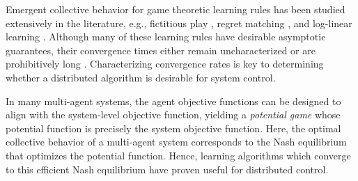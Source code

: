 
\label{ch2}



Emergent collective behavior for game theoretic learning rules has been studied extensively in the literature, e.g., fictitious play \cite{fp1,fp2,jsfp}, regret matching \cite{Hart2000}, and log-linear learning \cite{Alos-Ferrer2010, Blume1993, Shah2010}.  Although many of these learning rules have desirable asymptotic guarantees, their convergence times either remain uncharacterized or are prohibitively long \cite{Ellison2000, Kandori1993,Shah2010,Hart2010}. Characterizing convergence rates is key to determining whether a distributed algorithm is desirable for system control.

In many multi-agent systems, the agent objective functions can be designed to align with the system-level objective function, yielding  a \emph{potential game} \cite{Monderer1996} whose potential function is precisely the system objective function.  Here, the optimal collective behavior of a multi-agent system corresponds to the Nash equilibrium that optimizes the potential function. Hence, learning algorithms which converge to this efficient Nash equilibrium have proven useful for distributed control.

